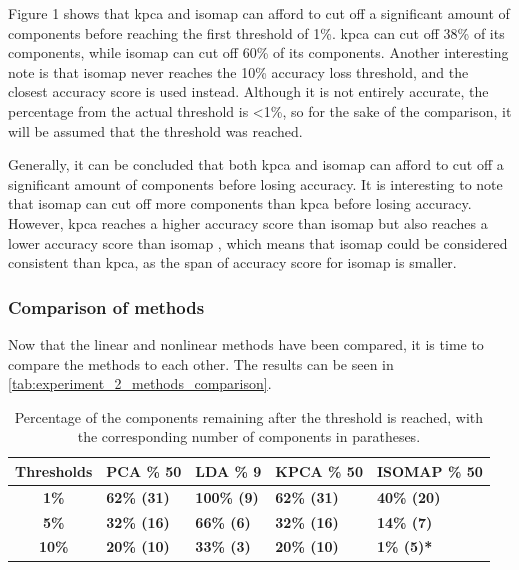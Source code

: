 Figure 1 shows that \gls{kpca} and \gls{isomap}  can afford to cut off a significant amount of components before reaching the first threshold of 1\%. \gls{kpca} can cut off 38\% of its components, while \gls{isomap}  can cut off 60\% of its components. Another interesting note is that \gls{isomap}  never reaches the 10\% accuracy loss threshold, and the closest accuracy score is used instead. Although it is not entirely accurate, the percentage from the actual threshold is <1\%, so for the sake of the comparison, it will be assumed that the threshold was reached.

Generally, it can be concluded that both \gls{kpca} and \gls{isomap}  can afford to cut off a significant amount of components before losing accuracy. It is interesting to note that \gls{isomap}  can cut off more components than \gls{kpca} before losing accuracy. However, \gls{kpca} reaches a higher accuracy score than \gls{isomap}  but also reaches a lower accuracy score than \gls{isomap} , which means that \gls{isomap}  could be considered consistent than kpca, as the span of accuracy score for \gls{isomap}  is smaller.


\subsubsection{Comparison of methods}
Now that the linear and nonlinear methods have been compared, it is time to compare the methods to each other. The results can be seen in \autoref{tab:experiment_2_methods_comparison}.


\begin{table}[htb!]
    \centering
    \begin{tabular}{cp{}p{}p{}p{}}
        \toprule
        \textbf{Thresholds} & \textbf{PCA \% 50} & \textbf{LDA \% 9} & \textbf{KPCA \% 50} & \textbf{ISOMAP \% 50} \\ \midrule
        \textbf{1\%} & \textbf{62\% (31)} & \textbf{100\% (9)} & \textbf{62\% (31)} & \textbf{40\% (20)} \\
        \textbf{5\%} & \textbf{32\% (16)} & \textbf{66\% (6)} & \textbf{32\% (16)} & \textbf{14\% (7)} \\
        \textbf{10\%} & \textbf{20\% (10)} & \textbf{33\% (3)} & \textbf{20\% (10)} & \textbf{1\% (5)*} \\
        \bottomrule
    \end{tabular}
    \caption{Percentage of the components remaining after the threshold is reached, with the corresponding number of components in paratheses.}
    \label{tab:experiment_2_methods_comparison}
\end{table}

